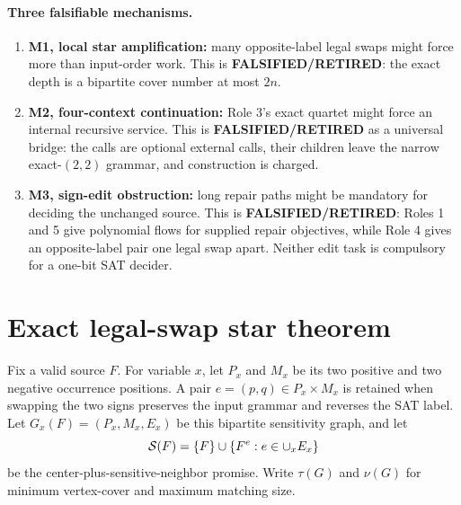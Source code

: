 \documentclass[11pt]{article}
\begin{document}
\paragraph{Three falsifiable mechanisms.}
\begin{enumerate}
\item \textbf{M1, local star amplification:} many opposite-label legal swaps
might force more than input-order work. This is
\textbf{FALSIFIED/RETIRED}: the exact depth is a bipartite cover number at
most $2n$.
\item \textbf{M2, four-context continuation:} Role 3's exact quartet might
force an internal recursive service. This is \textbf{FALSIFIED/RETIRED} as
a universal bridge: the calls are optional external calls, their children
leave the narrow exact-$(2,2)$ grammar, and construction is charged.
\item \textbf{M3, sign-edit obstruction:} long repair paths might be mandatory
for deciding the unchanged source. This is \textbf{FALSIFIED/RETIRED}:
Roles 1 and 5 give polynomial flows for supplied repair objectives, while
Role 4 gives an opposite-label pair one legal swap apart. Neither edit task
is compulsory for a one-bit SAT decider.
\end{enumerate}

\section{Exact legal-swap star theorem}
Fix a valid source $F$. For variable $x$, let $P_x$ and $M_x$ be its two
positive and two negative occurrence positions. A pair
$e=(p,q)\in P_x\times M_x$ is retained when swapping the two signs preserves
the input grammar and reverses the SAT label. Let
$G_x(F)=(P_x,M_x,E_x)$ be this bipartite sensitivity graph, and let
\[
 {\cal S}(F)=\{F\}\cup\{F^e:e\in\cup_x E_x\}
\]
be the center-plus-sensitive-neighbor promise. Write $\tau(G)$ and
$\nu(G)$ for minimum vertex-cover and maximum matching size.
\end{document}
